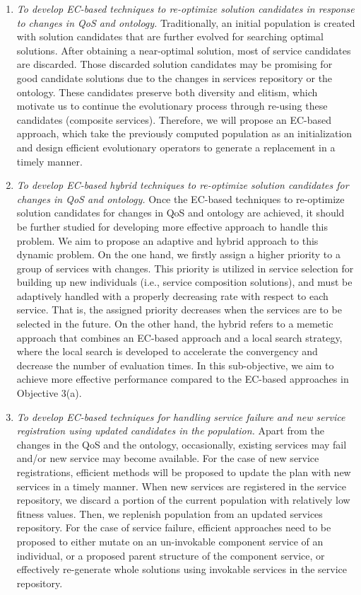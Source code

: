 \begin{enumerate}
  \begin{enumerate}
 \item \label{Obj:3.1} \emph{To develop EC-based techniques to re-optimize solution candidates in response to changes in QoS and ontology.} Traditionally, an initial population is created with solution candidates that are further evolved for searching optimal solutions. After obtaining a near-optimal solution, most of service candidates are discarded. Those discarded solution candidates may be promising for good candidate solutions due to the changes in services repository or the ontology. These candidates preserve both diversity and elitism, which motivate us to continue the evolutionary process through re-using these candidates (composite services). Therefore, we will propose an EC-based approach, which take the previously computed population as an initialization and design efficient evolutionary operators to generate a replacement in a timely manner.  
 
 \item \emph{To develop EC-based hybrid techniques to re-optimize solution candidates for changes in QoS and ontology.} Once the EC-based techniques to re-optimize solution candidates for changes in QoS and ontology are achieved, it should be further studied for developing more effective approach to handle this problem. We aim to propose an adaptive and hybrid approach to this dynamic problem. On the one hand, we firstly assign a higher priority to a group of services with changes. This priority is utilized in service selection for building up new individuals (i.e., service composition solutions), and must be adaptively handled with a properly decreasing rate with respect to each service. That is, the assigned priority decreases when the services are to be selected in the future. On the other hand, the hybrid refers to a memetic approach that combines an EC-based approach and a local search strategy, where the local search is developed to accelerate the convergency and decrease the number of evaluation times. In this sub-objective, we aim to achieve more effective performance compared to the EC-based approaches in Objective 3(a).
 
 
 \item \emph{To develop EC-based techniques for handling service failure and new service registration using updated candidates in the population.} Apart from the changes in the QoS and the ontology, occasionally, existing services may fail and/or new service may become available. For the case of new service registrations, efficient methods will be proposed to update the plan with new services in a timely manner. When new services are registered in the service repository, we discard a portion of the current population with relatively low fitness values. Then, we replenish population from an updated services repository. For the case of service failure, efficient approaches need to be proposed to either mutate on an un-invokable component service of an individual, or a proposed parent structure of the component service, or effectively re-generate whole solutions using invokable services in the service repository. 
 \end{enumerate}
   

\end{enumerate}
